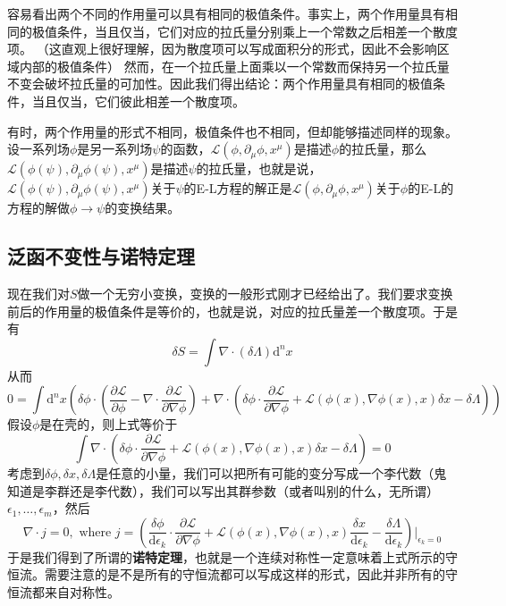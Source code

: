 \documentclass[UTF8, a4paper]{ctexart}
\begin{document}
容易看出两个不同的作用量可以具有相同的极值条件。事实上，两个作用量具有相同的极值条件，当且仅当，它们对应的拉氏量分别乘上一个常数之后相差一个散度项。
（这直观上很好理解，因为散度项可以写成面积分的形式，因此不会影响区域内部的极值条件）
然而，在一个拉氏量上面乘以一个常数而保持另一个拉氏量不变会破坏拉氏量的可加性。因此我们得出结论：两个作用量具有相同的极值条件，当且仅当，它们彼此相差一个散度项。

有时，两个作用量的形式不相同，极值条件也不相同，但却能够描述同样的现象。设一系列场$\phi$是另一系列场$\psi$的函数，$\mathcal{L}(\phi, \partial_\mu \phi, x^\mu)$是描述$\phi$的拉氏量，那么$\mathcal{L}(\phi(\psi), \partial_\mu \phi(\psi), x^\mu)$是描述$\psi$的拉氏量，也就是说，$\mathcal{L}(\phi(\psi), \partial_\mu \phi(\psi), x^\mu)$关于$\psi$的E-L方程的解正是$\mathcal{L}(\phi, \partial_\mu \phi, x^\mu)$关于$\phi$的E-L的方程的解做$\phi \rightarrow \psi$的变换结果。

\subsection{泛函不变性与诺特定理}

现在我们对$S$做一个无穷小变换，变换的一般形式刚才已经给出了。我们要求变换前后的作用量的极值条件是等价的，也就是说，对应的拉氏量差一个散度项。于是有
\begin{equation}
    \delta S = \int \nabla \cdot (\delta \Lambda) \mathrm{d}^n x
    \label{eq:equivalent-action}
\end{equation}
从而
\[
    0 = \int \mathrm{d}^n x \left( \delta \phi \cdot \left(\frac{\partial \mathcal{L}}{\partial \phi} - \nabla \cdot \frac{\partial \mathcal{L}}{\partial \nabla \phi} \right) 
+ \nabla \cdot \left( \delta \phi \cdot \frac{\partial \mathcal{L}}{\partial \nabla \phi} + \mathcal{L}(\phi(x), \nabla \phi (x), x) \delta x - \delta \Lambda \right) \right)
\]
假设$\phi$是在壳的，则上式等价于
\begin{equation}
    \int \nabla \cdot  \left( \delta \phi \cdot \frac{\partial \mathcal{L}}{\partial \nabla \phi} + \mathcal{L}(\phi(x), \nabla \phi (x), x) \delta x - \delta \Lambda \right) = 0
\end{equation}
考虑到$\delta \phi, \delta x, \delta \Lambda$是任意的小量，我们可以把所有可能的变分写成一个李代数（鬼知道是李群还是李代数），我们可以写出其群参数（或者叫别的什么，无所谓）$\epsilon_1, \ldots, \epsilon_m$，然后
\begin{equation}
    \nabla \cdot j = 0, \text{ where } j = \left(\frac{\delta \phi}{\mathrm{d}\epsilon_k} \cdot \frac{\partial \mathcal{L}}{\partial \nabla \phi} + \mathcal{L}(\phi(x), \nabla \phi (x), x) \frac{\delta x}{\mathrm{d} \epsilon_k} - \frac{\delta \Lambda}{\mathrm{d}\epsilon_k}\right) \bigg |_{\epsilon_k=0}
\end{equation}
于是我们得到了所谓的\textbf{诺特定理}，也就是一个连续对称性一定意味着上式所示的守恒流。需要注意的是不是所有的守恒流都可以写成这样的形式，因此并非所有的守恒流都来自对称性。
\end{document}
